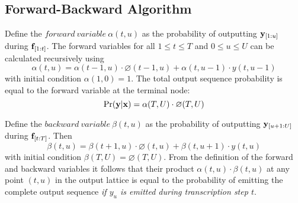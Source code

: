 \documentclass{article}
\begin{document}
\subsection{Forward-Backward Algorithm}
Define the $forward\ variable\ \alpha(t, u)$ as the probability of outputting $\mathbf{y}_{[1:u]}$ during $\mathbf{f}_{[1:t]}$. The forward variables for all $1 \leq t \leq T$ and $0 \leq u \leq U$ can be calculated recursively using
\begin{equation} \label{eq:alpha}
    \alpha(t, u) = \alpha(t-1, u) \cdot \varnothing(t-1, u) + \alpha(t, u-1) \cdot y(t, u-1)
\end{equation}
with initial condition $\alpha(1, 0) = 1$. The total output sequence probability is equal to the forward variable at the terminal node:
\begin{equation}
    \Pr(\mathbf{y} | \mathbf{x}) = \alpha(T, U) \cdot \varnothing(T, U)
\end{equation}

Define the $backward\ variable\ \beta(t, u)$ as the probability of outputting $\mathbf{y}_{[u+1:U]}$ during $\mathbf{f}_{[t:T]}$. Then
\begin{equation} \label{eq:beta}
    \beta(t, u) = \beta(t+1, u) \cdot \varnothing(t, u) + \beta(t, u+1) \cdot y(t, u)
\end{equation}
with initial condition $\beta(T, U) = \varnothing(T, U)$.
From the definition of the forward and backward variables it follows that their product $\alpha(t, u) \cdot \beta(t, u)$ at any point $(t, u)$ in the output lattice is equal to the probability of emitting the complete output sequence 
\textit{if $y_u$ is emitted during transcription step $t$}.
\end{document}
